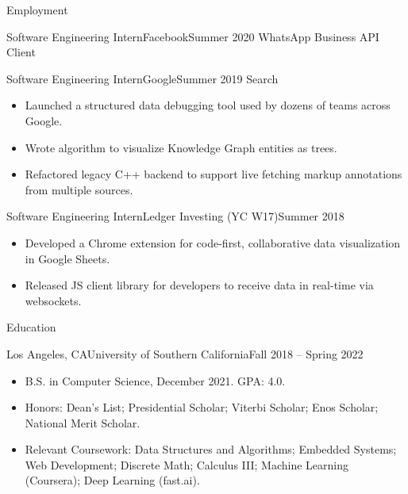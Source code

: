 \documentclass[calibri]{mcdowellcv}
\begin{document}
\makeheader

\begin{cvsection}{Employment}
	\begin{cvsubsection}{Software Engineering Intern}{Facebook}{Summer 2020}
		WhatsApp Business API Client
	\end{cvsubsection}

	\begin{cvsubsection}{Software Engineering Intern}{Google}{Summer 2019}
		Search
		\begin{itemize}
			\item Launched a structured data debugging tool used by dozens of teams across Google.
			\item Wrote algorithm to visualize Knowledge Graph entities as trees.
			\item Refactored legacy C++ backend to support live fetching markup annotations from multiple sources.
		\end{itemize}
	\end{cvsubsection}

	\begin{cvsubsection}{Software Engineering Intern}{Ledger Investing (YC W17)}{Summer 2018}
		\begin{itemize}
			\item Developed a Chrome extension for code-first, collaborative data visualization in Google Sheets.
			\item Released JS client library for developers to receive data in real-time via websockets.
		\end{itemize}
	\end{cvsubsection}
\end{cvsection}

\begin{cvsection}{Education}
	\begin{cvsubsection}{Los Angeles, CA}{University of Southern California}{Fall 2018 -- Spring 2022}
		\begin{itemize}
			\item B.S. in Computer Science, December 2021.  GPA: 4.0.
			\item Honors: Dean's List; Presidential Scholar; Viterbi Scholar; Enos Scholar; National Merit Scholar.
			\item Relevant Coursework: Data Structures and Algorithms; Embedded Systems; Web Development; Discrete Math;  Calculus III; Machine Learning (Coursera); Deep Learning (fast.ai).
		\end{itemize}
	\end{cvsubsection}
\end{cvsection}
\end{document}
